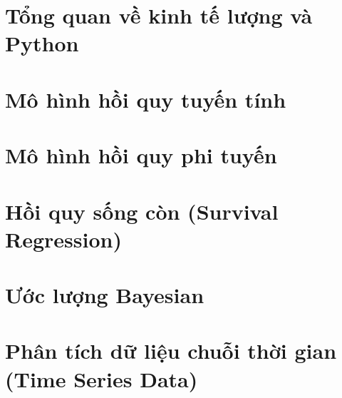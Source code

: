 \documentclass[openany]{book}
\begin{document}


\frontmatter

\tableofcontents
\newpage

\mainmatter

\part{Tổng quan về kinh tế lượng và Python}






\part{Mô hình hồi quy tuyến tính}







\part{Mô hình hồi quy phi tuyến}








\part{Hồi quy sống còn (Survival Regression)}






\part{Ước lượng Bayesian}







\part{Phân tích dữ liệu chuỗi thời gian (Time Series Data)}



\end{document}
